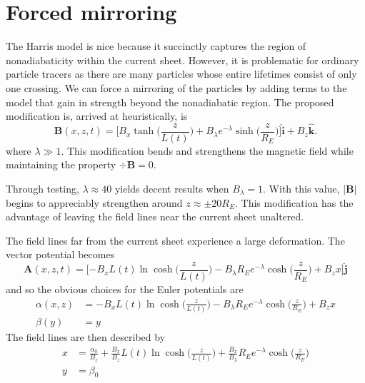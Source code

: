 \documentclass{article}
\begin{document}
	\section{Forced mirroring}
	
	The Harris model is nice because it succinctly captures the region of nonadiabaticity within the current sheet. However, it is problematic for ordinary particle tracers as there are many particles whose entire lifetimes consist of only one crossing. We can force a mirroring of the particles by adding terms to the model that gain in strength beyond the nonadiabatic region. The proposed modification is, arrived at heuristically, is
	\[
		\mathbf{B}(x, z, t) = \Big[B_x\tanh\Big(\frac{z}{L(t)}\Big) + B_{\lambda}e^{-\lambda}\sinh\Big(\frac{z}{R_E}\Big)\Big]\hat{\mathbf{i}} + B_z\hat{\mathbf{k}}.
	\]
	where $\lambda \gg 1$. This modification bends and strengthens the magnetic field while maintaining the property $\div{\mathbf{B}}=0$.
	
	Through testing, $\lambda \approx 40$ yields decent results when $B_\lambda = 1$. With this value, $|\mathbf{B}|$ begins to appreciably strengthen around $z \approx \pm 20 R_E$. This modification has the advantage of leaving the field lines near the current sheet unaltered.
	
	The field lines far from the current sheet experience a large deformation. The vector potential becomes
	\[
		\mathbf{A}(x, z, t) =  \Big[{-B_xL(t)}\ln\cosh\Big(\frac{z}{L(t)}\Big) - B_\lambda R_E e^{-\lambda}\cosh\Big(\frac{z}{R_E}\Big) + B_zx\Big]\hat{\mathbf{j}}
	\]
	and so the obvious choices for the Euler potentials are
	\begin{align*}
		\alpha(x, z) &= -B_xL(t)\ln\cosh\Big(\frac{z}{L(t)}\Big) - B_\lambda R_E e^{-\lambda}\cosh\Big(\frac{z}{R_E}\Big) + B_zx \\
		\beta(y) &= y
	\end{align*}
	The field lines are then described by
	\begin{align*}
		x &= \frac{\alpha_0}{B_z} + \frac{B_x}{B_z}L(t)\ln\cosh\Big(\frac{z}{L(t)}\Big) + \frac{B_x}{B_\lambda}R_E e^{-\lambda}\cosh\Big(\frac{z}{R_E}\Big) \\
		y &= \beta_0
	\end{align*}
	
\end{document}
